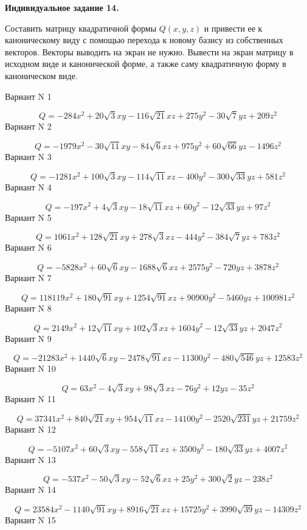 \documentclass[11pt]{report}
\begin{document}
\pagestyle{empty}

{\bf Индивидуальное задание 14.}


Составить матрицу квадратичной формы $Q(x, y, z)$ и привести ее к каноническому виду 
с помощью перехода к новому базису из собственных векторов. 
Векторы выводить на экран не нужно. 
Вывести на экран матрицу в исходном виде и канонической форме, 
а также саму квадратичную форму в каноническом виде.

Вариант N 1

$$Q = - 284 x^{2} + 20 \sqrt{3} x y - 116 \sqrt{21} x z + 275 y^{2} - 30 \sqrt{7} y z + 209 z^{2}$$Вариант N 2

$$Q = - 1979 x^{2} - 30 \sqrt{11} x y - 84 \sqrt{6} x z + 975 y^{2} + 60 \sqrt{66} y z - 1496 z^{2}$$Вариант N 3

$$Q = - 1281 x^{2} + 100 \sqrt{3} x y - 114 \sqrt{11} x z - 400 y^{2} - 300 \sqrt{33} y z + 581 z^{2}$$Вариант N 4

$$Q = - 197 x^{2} + 4 \sqrt{3} x y - 18 \sqrt{11} x z + 60 y^{2} - 12 \sqrt{33} y z + 97 z^{2}$$Вариант N 5

$$Q = 1061 x^{2} + 128 \sqrt{21} x y + 278 \sqrt{3} x z - 444 y^{2} - 384 \sqrt{7} y z + 783 z^{2}$$Вариант N 6

$$Q = - 5828 x^{2} + 60 \sqrt{6} x y - 1688 \sqrt{6} x z + 2575 y^{2} - 720 y z + 3878 z^{2}$$Вариант N 7

$$Q = 118119 x^{2} + 180 \sqrt{91} x y + 1254 \sqrt{91} x z + 90900 y^{2} - 5460 y z + 100981 z^{2}$$Вариант N 8

$$Q = 2149 x^{2} + 12 \sqrt{11} x y + 102 \sqrt{3} x z + 1604 y^{2} - 12 \sqrt{33} y z + 2047 z^{2}$$Вариант N 9

$$Q = - 21283 x^{2} + 1440 \sqrt{6} x y - 2478 \sqrt{91} x z - 11300 y^{2} - 480 \sqrt{546} y z + 12583 z^{2}$$Вариант N 10

$$Q = 63 x^{2} - 4 \sqrt{3} x y + 98 \sqrt{3} x z - 76 y^{2} + 12 y z - 35 z^{2}$$Вариант N 11

$$Q = 37341 x^{2} + 840 \sqrt{21} x y + 954 \sqrt{11} x z - 14100 y^{2} - 2520 \sqrt{231} y z + 21759 z^{2}$$Вариант N 12

$$Q = - 5107 x^{2} + 60 \sqrt{3} x y - 558 \sqrt{11} x z + 3500 y^{2} - 180 \sqrt{33} y z + 4007 z^{2}$$Вариант N 13

$$Q = - 537 x^{2} - 50 \sqrt{3} x y - 52 \sqrt{6} x z + 25 y^{2} + 300 \sqrt{2} y z - 238 z^{2}$$Вариант N 14

$$Q = 23584 x^{2} - 1140 \sqrt{91} x y + 8916 \sqrt{21} x z + 15725 y^{2} + 3990 \sqrt{39} y z - 14309 z^{2}$$Вариант N 15
\end{document}
